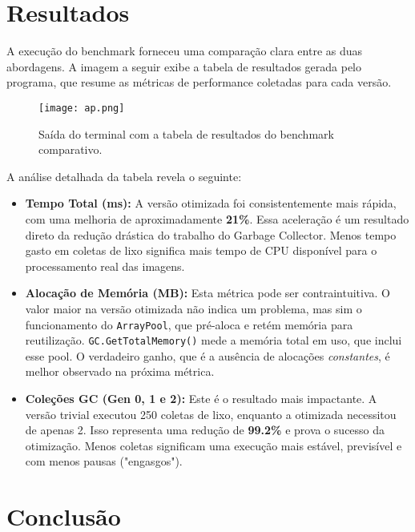 \documentclass[
	12pt,
	oneside,
	a4paper,
	english,
	brazil,
]{abntex2}
\begin{document}
\section{Resultados}

A execução do benchmark forneceu uma comparação clara entre as duas abordagens. A imagem a seguir exibe a tabela de resultados gerada pelo programa, que resume as métricas de performance coletadas para cada versão.

\begin{figure}[h!]
  \centering
  \texttt{[image: ap.png]}
  \caption{Saída do terminal com a tabela de resultados do benchmark comparativo.}
  \label{fig:resultados}
\end{figure}

A análise detalhada da tabela revela o seguinte:
\begin{itemize}
    \item \textbf{Tempo Total (ms):} A versão otimizada foi consistentemente mais rápida, com uma melhoria de aproximadamente \textbf{21\%}. Essa aceleração é um resultado direto da redução drástica do trabalho do Garbage Collector. Menos tempo gasto em coletas de lixo significa mais tempo de CPU disponível para o processamento real das imagens.
    \item \textbf{Alocação de Memória (MB):} Esta métrica pode ser contraintuitiva. O valor maior na versão otimizada não indica um problema, mas sim o funcionamento do \texttt{ArrayPool}, que pré-aloca e retém memória para reutilização. \texttt{GC.GetTotalMemory()} mede a memória total em uso, que inclui esse pool. O verdadeiro ganho, que é a ausência de alocações \textit{constantes}, é melhor observado na próxima métrica.
    \item \textbf{Coleções GC (Gen 0, 1 e 2):} Este é o resultado mais impactante. A versão trivial executou 250 coletas de lixo, enquanto a otimizada necessitou de apenas 2. Isso representa uma redução de \textbf{99.2\%} e prova o sucesso da otimização. Menos coletas significam uma execução mais estável, previsível e com menos pausas ("engasgos").
\end{itemize}

\clearpage
\section{Conclusão}
\end{document}
